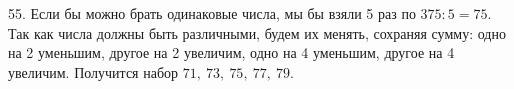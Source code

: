 55. Если бы можно брать одинаковые числа, мы бы взяли 5 раз по $375:5=75.$ Так как числа должны быть различными, будем их менять, сохраняя сумму: одно на 2 уменьшим, другое на 2 увеличим, одно на 4 уменьшим, другое на 4 увеличим. Получится набор $71,\ 73,\ 75,\ 77,\ 79.$\\
